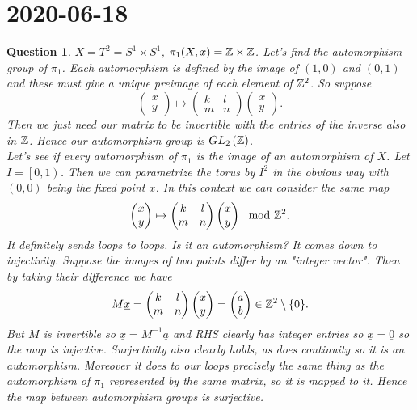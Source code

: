 \documentclass[a4paper]{article}
\newtheorem{que}[thm]{Question}
\begin{document}
\section*{ 2020-06-18}

\begin{que} $X=T^{2}=S^{1}\times S^{1}$, $\pi_1(X,x)=\mathbb{Z}\times\mathbb{Z}$. Let's find the automorphism group of $\pi_1$. Each automorphism is defined by the image of $\left( 1,0 \right) $ and $\left( 0,1 \right) $ and these must give a unique preimage of each element of $\mathbb{Z}^{2}$. So suppose \[
    \begin{pmatrix} x\\ y  \end{pmatrix}\mapsto \begin{pmatrix} k & l \\ m & n  \end{pmatrix}\begin{pmatrix} x\\y \end{pmatrix}
.\] 
Then we just need our matrix to be invertible with the entries of the inverse also in $\mathbb{Z}$. Hence our automorphism group is $GL_{2}\left( \mathbb{Z} \right) $.\\
Let's see if every automorphism of $\pi_1$ is the image of an automorphism of $X$. Let $I=\left[ 0,1 \right) $. Then we can parametrize the torus by $I^2$ in the obvious way with $(0,0)$ being the fixed point $x$. In this context we can consider the same map \[
    \begin{pmatrix} x\\ y  \end{pmatrix}\mapsto \begin{pmatrix} k & l \\ m & n  \end{pmatrix}\begin{pmatrix} x\\y \end{pmatrix} \mod{\mathbb{Z}}^2
.\] It definitely sends loops to loops. Is it an automorphism? It comes down to injectivity. Suppose the images of two points differ by an "integer vector". Then by taking their difference we have \[
M\underline{x}=\begin{pmatrix} k & l\\ m & n \end{pmatrix} \begin{pmatrix} x\\y \end{pmatrix}=\begin{pmatrix} a\\b \end{pmatrix}\in \mathbb{Z}^2\setminus \{0\}
.\] 
But $M$ is invertible so $\underline{x}=M^{-1}\underline{a}$ and RHS clearly has integer entries so $\underline{x}=\underline{0}$ so the map is injective. Surjectivity also clearly holds, as does continuity so it is an automorphism. Moreover it does to our loops precisely the same thing as the automorphism of $\pi_1$ represented by the same matrix, so it is mapped to it. Hence the map between automorphism groups is surjective.

\end{que}
\end{document}
